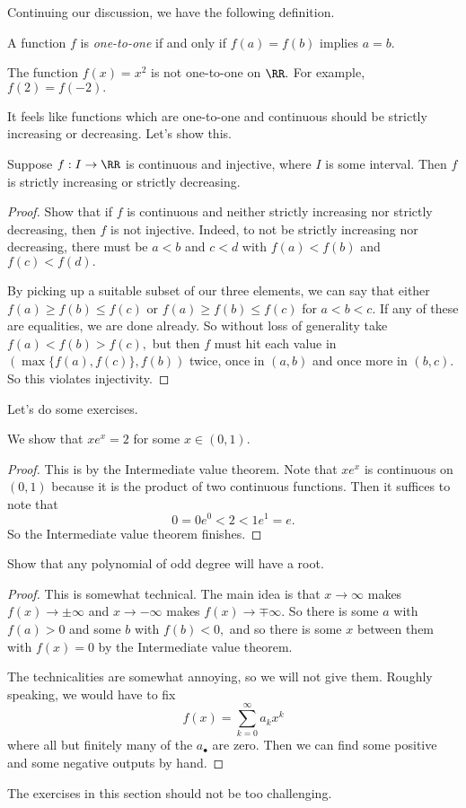 \documentclass[../notes.tex]{subfiles}
\begin{document}
Continuing our discussion, we have the following definition.
\begin{definition}
	A function $f$ is \textit{one-to-one} if and only if $f(a)=f(b)$ implies $a=b.$
\end{definition}
\begin{nex}
	The function $f(x)=x^2$ is not one-to-one on $\RR.$ For example, $f(2)=f(-2).$
\end{nex}
It feels like functions which are one-to-one and continuous should be strictly increasing or decreasing. Let's show this.
\begin{proposition}
	Suppose $f:I\to\RR$ is continuous and injective, where $I$ is some interval. Then $f$ is strictly increasing or strictly decreasing.
\end{proposition}
\begin{proof}
	Show that if $f$ is continuous and neither strictly increasing nor strictly decreasing, then $f$ is not injective. Indeed, to not be strictly increasing nor decreasing, there must be $a<b$ and $c<d$ with $f(a)<f(b)$ and $f(c)<f(d).$
	
	By picking up a suitable subset of our three elements, we can say that either $f(a)\ge f(b)\le f(c)$ or $f(a)\ge f(b)\le f(c)$ for $a<b<c.$ If any of these are equalities, we are done already. So without loss of generality take $f(a)<f(b)>f(c),$ but then $f$ must hit each value in $(\max\{f(a),f(c)\},f(b))$ twice, once in $(a,b)$ and once more in $(b,c).$ So this violates injectivity.
\end{proof}
Let's do some exercises.
\begin{exercise}
	We show that $xe^x=2$ for some $x\in(0,1).$
\end{exercise}
\begin{proof}
	This is by the Intermediate value theorem. Note that $xe^x$ is continuous on $(0,1)$ because it is the product of two continuous functions. Then it suffices to note that
	\[0=0e^0<2<1e^1=e.\]
	So the Intermediate value theorem finishes.
\end{proof}
\begin{exercise}
	Show that any polynomial of odd degree will have a root.
\end{exercise}
\begin{proof}
	This is somewhat technical. The main idea is that $x\to\infty$ makes $f(x)\to\pm\infty$ and $x\to-\infty$ makes $f(x)\to\mp\infty.$ So there is some $a$ with $f(a)>0$ and some $b$ with $f(b)<0,$ and so there is some $x$ between them with $f(x)=0$ by the Intermediate value theorem.

	The technicalities are somewhat annoying, so we will not give them. Roughly speaking, we would have to fix
	\[f(x)=\sum_{k=0}^\infty a_kx^k\]
	where all but finitely many of the $a_\bullet$ are zero. Then we can find some positive and some negative outputs by hand.
\end{proof}
The exercises in this section should not be too challenging.
\end{document}
